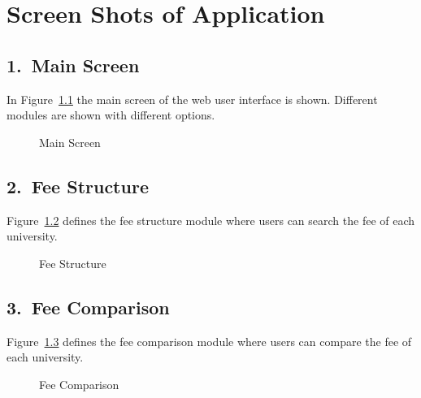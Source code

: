 \chapter{Screen Shots of Application}

\section*{1.\ Main Screen}

In Figure~\ref{fig:main_screen} the main screen of the web user interface is shown. Different modules are shown with different options.

\begin{figure}[H]
    \centering
    \caption{Main Screen}
    \label{fig:main_screen}
\end{figure}

\section*{2.\ Fee Structure}

Figure~\ref{fig:fee_struct} defines the fee structure module where users can search the fee of each university.

\begin{figure}[H]
    \centering
    \caption{Fee Structure}
    \label{fig:fee_struct}
\end{figure}

\section*{3.\ Fee Comparison}

Figure~\ref{fig:fee_compare} defines the fee comparison module where users can compare the fee of each university.

\begin{figure}[H]
    \centering
    \caption{Fee Comparison}
    \label{fig:fee_compare}
\end{figure}

